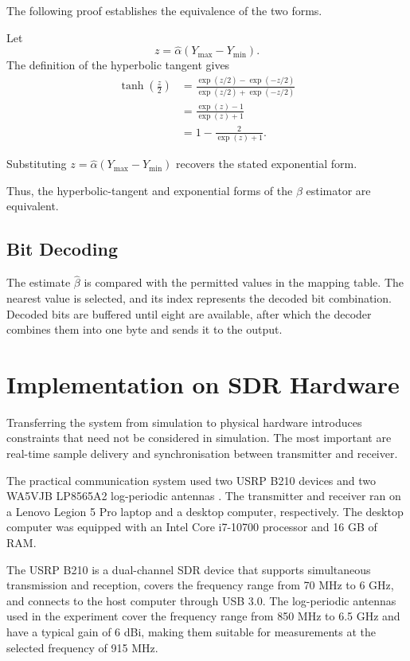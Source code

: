 \documentclass[a4paper, 12pt, openany]{book}
\begin{document}
The following proof establishes the equivalence of the two forms.

\begin{tcolorbox}[colback=red!5!white,colframe=red!50!black,title=Proof 2: Equivalence of the two forms of the $\beta$ estimator]
Let
\[
z=\hat{\alpha}(Y_{\max}-Y_{\min}).
\]
The definition of the hyperbolic tangent gives
\[
\begin{aligned}
\tanh\!\left(\frac{z}{2}\right)
&=
\frac{\exp(z/2)-\exp(-z/2)}
{\exp(z/2)+\exp(-z/2)} \\
&=
\frac{\exp(z)-1}{\exp(z)+1} \\
&=
1-
\frac{2}{\exp(z)+1}.
\end{aligned}
\]

Substituting $z=\hat{\alpha}(Y_{\max}-Y_{\min})$ recovers the stated exponential form.
\end{tcolorbox}
Thus, the hyperbolic-tangent and exponential forms of the $\beta$ estimator are equivalent.

\subsection{Bit Decoding}
The estimate $\hat{\beta}$ is compared with the permitted values in the mapping table. The nearest value is selected, and its index represents the decoded bit combination. Decoded bits are buffered until eight are available, after which the decoder combines them into one byte and sends it to the output.

\section{Implementation on SDR Hardware}

Transferring the system from simulation to physical hardware introduces constraints that need not be considered in simulation. The most important are real-time sample delivery and synchronisation between transmitter and receiver.

The practical communication system used two USRP B210 devices \cite{ettusB210} and two WA5VJB LP8565A2 log-periodic antennas \cite{wa5vjbLP8565A2}. The transmitter and receiver ran on a Lenovo Legion 5 Pro laptop and a desktop computer, respectively. The desktop computer was equipped with an Intel Core i7-10700 processor and 16 GB of RAM.

The USRP B210 is a dual-channel SDR device that supports simultaneous transmission and reception, covers the frequency range from 70 MHz to 6 GHz, and connects to the host computer through USB 3.0. The log-periodic antennas used in the experiment cover the frequency range from 850 MHz to 6.5 GHz and have a typical gain of 6 dBi, making them suitable for measurements at the selected frequency of 915 MHz.
\end{document}
